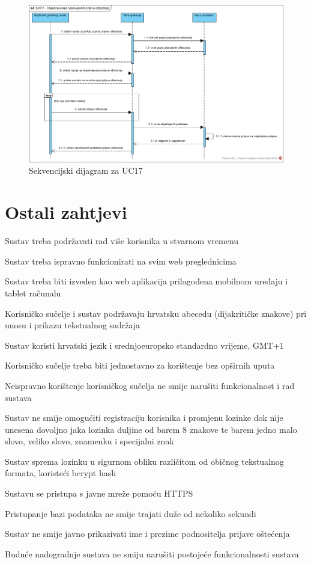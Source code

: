 \begin{figure}[H]
	\includegraphics[scale=0.5]{slike/UC17_sekvencijski.jpg} %
	\centering
	\caption{Sekvencijski dijagram za UC17}
	\label{fig:SekvencijskiDijagramObjedinjavanjeNepovezanihPrijavaOštećenja}
\end{figure}

\eject

\section{Ostali zahtjevi}

\begin{packed_enum}
	\item Sustav treba podržavati rad više korisnika u stvarnom vremenu
	\item Sustav treba ispravno funkcionirati na svim web preglednicima
	\item Sustav treba biti izveden kao web aplikacija prilagođena mobilnom uređaju i tablet računalu
	\item Korisničko sučelje i sustav podržavaju hrvatsku abecedu (dijakritičke znakove) pri unosu i prikazu tekstualnog sadržaja
	\item Sustav koristi hrvatski jezik i srednjoeuropsko standardno vrijeme, GMT+1
	\item Korisničko sučelje treba biti jednostavno za korištenje bez opširnih uputa
	\item Neispravno korištenje korisničkog sučelja ne smije narušiti funkcionalnost i rad sustava 
	\item Sustav ne smije omogućiti registraciju korisnika i promjenu lozinke dok nije unesena dovoljno jaka lozinka duljine od barem 8 znakove te barem jedno malo slovo, veliko slovo, znamenku i specijalni znak
	\item Sustav sprema lozinku u sigurnom obliku različitom od običnog tekstualnog formata, koristeći bcrypt hash
	\item Sustavu se pristupa s javne mreže pomoću HTTPS
	\item Pristupanje bazi podataka ne smije trajati duže od nekoliko sekundi
	\item Sustav ne smije javno prikazivati ime i prezime podnositelja prijave oštećenja
	\item Buduće nadogradnje sustava ne smiju narušiti postojeće funkcionalnosti sustava
\end{packed_enum}

